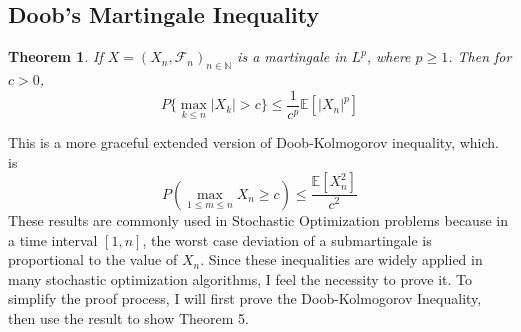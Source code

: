 \documentclass[10pt]{article}
\newtheorem{theorem}{Theorem}
\begin{document}
\subsection{Doob’s Martingale Inequality}
\begin{theorem}
If $X=(X_n, \mathcal{F}_n)_{n \in \mathbb{N}}$ is a martingale in $L^p$, where $p \ge 1$. Then for $c>0$,
$$P\{\max_{k \le n}|X_k|>c\}\le \frac{1}{c^p}\mathbb{E}[|X_n|^p]$$ 
\end{theorem}
This is a more graceful extended  version of Doob-Kolmogorov inequality, which. is $$P(\max_{1 \le m \le n}X_n \ge c)\le \frac{\mathbb{E}[X_n^2]}{c^2}$$These results are commonly used in Stochastic Optimization problems because in a time interval $[1,n]$, the worst case deviation of a submartingale is proportional to the value of $X_n$. Since these inequalities are widely applied in many stochastic optimization algorithms, I feel the necessity to prove it. To simplify the proof process, I will first prove the Doob-Kolmogorov Inequality, then use the result to show Theorem 5.
\end{document}
